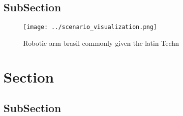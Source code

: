 \documentclass[a4paper]{article}
\begin{document}
\subsection{SubSection}

\begin{figure}
\centering
\texttt{[image: ../scenario\_visualization.png]}
\caption{Robotic arm brasil commonly given the latin Techn
}
\end{figure}
 
\section{Section}

\subsection{SubSection}
\end{document}
